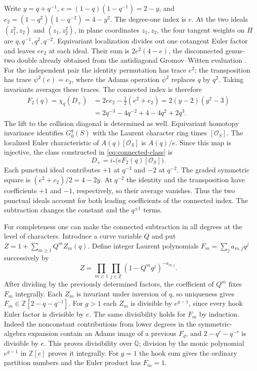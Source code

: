Write $y=q+q^{-1}$, $e=(1-q)(1-q^{-1})=2-y$, and
$e_2=(1-q^2)(1-q^{-2})=4-y^2$. The degree-one index is $e$.
At the two ideals $(z_1^2,z_2)$ and $(z_1,z_2^2)$, in plane coordinates
$z_1,z_2$, the four tangent weights on $H$ are
$q,q^{-1},q^2,q^{-2}$. Equivariant localization divides out one
cotangent Euler factor and leaves $ee_2$ at each ideal.
Their sum is $2e^2(4-e)$, the disconnected genus-two double already
obtained from the antidiagonal Gromov--Witten evaluation
\cite[\S6]{wuebben-antidiagonal}.
For the independent pair the identity permutation has trace $e^2$;
the transposition has trace $\psi^2(e)=e_2$, where the Adams operation
$\psi^2$ replaces $q$ by $q^2$. Taking invariants averages these traces.
The connected index is therefore
\begin{align}
 F_2(q)=\chi_q(D_+)
 &=2ee_2-\tfrac12(e^2+e_2)
   =2(y-2)(y^2-3) \nonumber\\
 &=2q^{-3}-4q^{-2}+4-4q^2+2q^3 .
 \label{eq:double-character}
\end{align}
The lift to the collision diagonal is determined as well.
Equivariant homotopy invariance identifies $G_0^q(S)$ with the Laurent
character ring times $[\mathcal O_S]$. The localized Euler characteristic
of $A(q)[\mathcal O_S]$ is $A(q)/e$. Since this map is injective, the
class constructed in \eqref{eq:connected-class} is
\begin{equation}
                  D_+=i_*\big(e F_2(q)[\mathcal O_S]\big) .
\end{equation}
Each punctual ideal contributes $+1$ at $q^{-3}$ and $-2$ at
$q^{-2}$. The graded symmetric square is $(e^2+e_2)/2=4-2y$.
At $q^{-2}$ the identity and the transposition have coefficients $+1$
and $-1$, respectively, so their average vanishes. Thus the two
punctual ideals account for both leading coefficients of the connected
index. The subtraction changes the constant and the $q^{\pm1}$ terms.

For completeness one can make the connected subtraction in all degrees
at the level of characters. Introduce a curve variable $Q$ and put
$Z=1+\sum_{m\ge1}Q^m Z_m(q)$. Define integer Laurent polynomials
$F_m=\sum_j a_{m,j}q^j$ successively by
\begin{equation}
 Z=\prod_{m\ge1}\prod_{j\in\mathbb Z}(1-Q^m q^j)^{-a_{m,j}} .
 \label{eq:euler-product}
\end{equation}
After dividing by the previously determined factors, the coefficient
of $Q^m$ fixes $F_m$ integrally. Each $Z_m$ is invariant under inversion
of $q$, so uniqueness gives $F_m\in\mathbb Z[2-q-q^{-1}]$.
For $g>1$ each $Z_m$ is divisible by $e^{g-1}$, since every hook Euler
factor is divisible by $e$. The same divisibility holds for $F_m$ by
induction. Indeed the nonconstant contributions from lower degrees in
the symmetric-algebra expansion contain an Adams image of a previous
$F_d$, and $2-q^r-q^{-r}$ is divisible by $e$. This proves divisibility
over $\mathbb Q$; division by the monic polynomial $e^{g-1}$ in
$\mathbb Z[e]$ proves it integrally. For $g=1$ the hook sum gives the
ordinary partition numbers and the Euler product has $F_m=1$.

